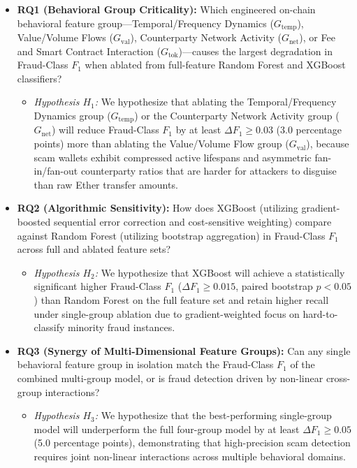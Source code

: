 \documentclass[conference]{IEEEtran}
\begin{document}
\begin{itemize}
    \item \textbf{RQ1 (Behavioral Group Criticality):} Which engineered on-chain behavioral feature group---Temporal/Frequency Dynamics ($G_{\text{temp}}$), Value/Volume Flows ($G_{\text{val}}$), Counterparty Network Activity ($G_{\text{net}}$), or Fee and Smart Contract Interaction ($G_{\text{tok}}$)---causes the largest degradation in Fraud-Class $F_1$ when ablated from full-feature Random Forest and XGBoost classifiers?
    \begin{itemize}
        \item \emph{Hypothesis $H_1$:} We hypothesize that ablating the Temporal/Frequency Dynamics group ($G_{\text{temp}}$) or the Counterparty Network Activity group ($G_{\text{net}}$) will reduce Fraud-Class $F_1$ by at least $\Delta F_1 \ge 0.03$ (3.0 percentage points) more than ablating the Value/Volume Flow group ($G_{\text{val}}$), because scam wallets exhibit compressed active lifespans and asymmetric fan-in/fan-out counterparty ratios that are harder for attackers to disguise than raw Ether transfer amounts.
    \end{itemize}
    \item \textbf{RQ2 (Algorithmic Sensitivity):} How does XGBoost (utilizing gradient-boosted sequential error correction and cost-sensitive weighting) compare against Random Forest (utilizing bootstrap aggregation) in Fraud-Class $F_1$ across full and ablated feature sets?
    \begin{itemize}
        \item \emph{Hypothesis $H_2$:} We hypothesize that XGBoost will achieve a statistically significant higher Fraud-Class $F_1$ ($\Delta F_1 \ge 0.015$, paired bootstrap $p < 0.05$) than Random Forest on the full feature set and retain higher recall under single-group ablation due to gradient-weighted focus on hard-to-classify minority fraud instances.
    \end{itemize}
    \item \textbf{RQ3 (Synergy of Multi-Dimensional Feature Groups):} Can any single behavioral feature group in isolation match the Fraud-Class $F_1$ of the combined multi-group model, or is fraud detection driven by non-linear cross-group interactions?
    \begin{itemize}
        \item \emph{Hypothesis $H_3$:} We hypothesize that the best-performing single-group model will underperform the full four-group model by at least $\Delta F_1 \ge 0.05$ (5.0 percentage points), demonstrating that high-precision scam detection requires joint non-linear interactions across multiple behavioral domains.
    \end{itemize}
\end{itemize}
\end{document}
